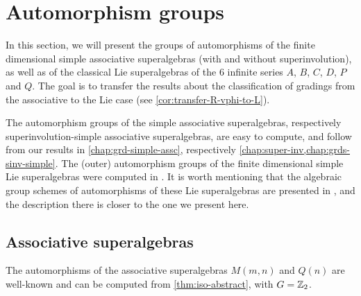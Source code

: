 \section{Automorphism groups}\label{sec:Aut-Lie-chap}

In this section, we will present the groups of automorphisms of the finite dimensional simple associative superalgebras (with and without superinvolution), as well as of the classical Lie superalgebras of the $6$ infinite series $A$, $B$, $C$, $D$, $P$ and $Q$. 
The goal is to transfer the results about the classification of gradings from the associative to the Lie case (see \cref{cor:transfer-R-vphi-to-L}). 

The automorphism groups of the simple associative superalgebras, respectively superinvolution-simple associative superalgebras, are easy to compute, and follow from our results in \cref{chap:grd-simple-assc}, respectively \cref{chap:super-inv,chap:grds-sinv-simple}. 
The (outer) automorphism groups of the finite dimensional simple Lie superalgebras were computed in \cite{serganova}. 
It is worth mentioning that the algebraic group schemes of automorphisms of these Lie superalgebras are presented in \cite[Theorem 4.1]{Pianzola}, and the description there is closer to the one we present here. 

\subsection{Associative superalgebras}\label{ssec:aut-ass-sinv}

The automorphisms of the associative superalgebras $M(m,n)$ and $Q(n)$ are well-known and can be computed from \cref{thm:iso-abstract}, with $G = \mathbb{Z}_2$. 

